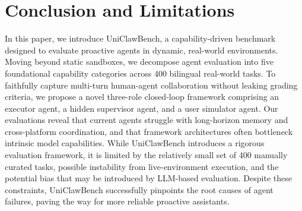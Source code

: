 \section{Conclusion and Limitations}
\label{sec:conclusion}
In this paper, we introduce UniClawBench, a capability-driven benchmark designed to evaluate proactive agents in dynamic, real-world environments. Moving beyond static sandboxes, we decompose agent evaluation into five foundational capability categories across 400 bilingual real-world tasks. To faithfully capture multi-turn human-agent collaboration without leaking grading criteria, we propose a novel three-role closed-loop framework comprising an executor agent, a hidden supervisor agent, and a user simulator agent. Our evaluations reveal that current agents struggle with long-horizon memory and cross-platform coordination, and that framework architectures often bottleneck intrinsic model capabilities. While UniClawBench introduces a rigorous evaluation framework, it is limited by the relatively small set of 400 manually curated tasks, possible instability from live-environment execution, and the potential bias that may be introduced by LLM-based evaluation. Despite these constraints, UniClawBench successfully pinpoints the root causes of agent failures, paving the way for more reliable proactive assistants.

